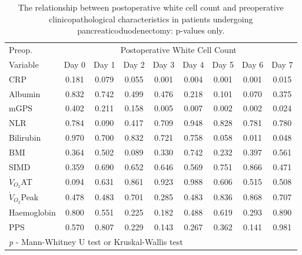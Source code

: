 \begin{table}[p]
	\caption{The relationship  between postoperative white cell count and preoperative clinicopathological characteristics in patients undergoing pancreaticoduodenectomy: p-values only. }
	\label{table:sirs_wcc_pvalues}
	\footnotesize
	\centering
	\renewcommand{\arraystretch}{1.2} %

	\begin{tabular}{|l | c c c c c c c c|}
		\hline
		Preop.              &      \multicolumn{8}{c|}{Postoperative White Cell Count}      \\
		Variable            & Day 0 & Day 1 & Day 2 & Day 3 & Day 4 & Day 5 & Day 6 & Day 7 \\ \hline
		CRP                 & 0.181 & 0.079 & 0.055 & 0.001 & 0.004 & 0.001 & 0.001 & 0.015 \\
		Albumin             & 0.832 & 0.742 & 0.499 & 0.476 & 0.218 & 0.101 & 0.070 & 0.375 \\
		mGPS                & 0.402 & 0.211 & 0.158 & 0.005 & 0.007 & 0.002 & 0.002 & 0.024 \\
		NLR                 & 0.784 & 0.090 & 0.417 & 0.709 & 0.948 & 0.828 & 0.781 & 0.780 \\
		Bilirubin           & 0.970 & 0.700 & 0.832 & 0.721 & 0.758 & 0.058 & 0.011 & 0.048 \\
		BMI                 & 0.364 & 0.502 & 0.089 & 0.330 & 0.742 & 0.232 & 0.397 & 0.561 \\
		SIMD                & 0.359 & 0.690 & 0.652 & 0.646 & 0.569 & 0.751 & 0.866 & 0.471 \\
		$\dot{V}_{O_2}$AT   & 0.094 & 0.631 & 0.861 & 0.923 & 0.988 & 0.606 & 0.515 & 0.508 \\
		$\dot{V}_{O_2}$Peak & 0.478 & 0.483 & 0.701 & 0.285 & 0.483 & 0.836 & 0.868 & 0.707 \\
		Haemoglobin         & 0.800 & 0.551 & 0.225 & 0.182 & 0.488 & 0.619 & 0.293 & 0.890 \\
		PPS                 & 0.570 & 0.807 & 0.229 & 0.143 & 0.267 & 0.362 & 0.141 & 0.981 \\ \hline
		\multicolumn{9}{l}{\textit{p} - Mann-Whitney U test or Kruskal-Wallis test}
	\end{tabular}	
	\vspace{1cm}


\end{table}
